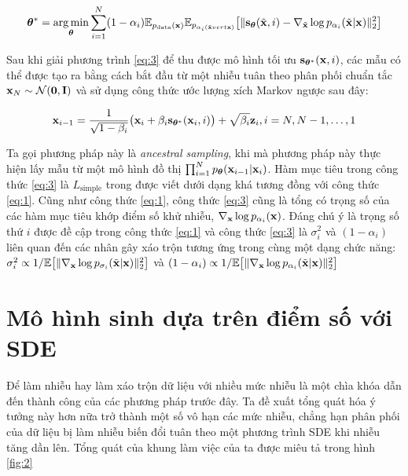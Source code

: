 \documentclass{article} %
\begin{document}
\begin{equation} \label{eq:3}
    \boldsymbol{\theta}^{\ast} = \operatorname*{arg\,min}_{\boldsymbol{\theta}} \sum_{i=1}^N (1 - \alpha_i) \mathbb{E}_{p_{\mathrm{data}}(\bold{x})} \mathbb{E}_{p_{\alpha_i (\tilde{\bold{x}} vert \bold{x})}} \big \lbrack \lVert \bold{s}_{\boldsymbol{\theta}} (\tilde{\bold{x}}, i) - \nabla_{\tilde{\bold{x}}} \log p_{\alpha_i} (\tilde{\bold{x}} \vert \bold{x}) \rVert_2^2 \big \rbrack
\end{equation}

Sau khi giải phương trình \ref{eq:3} để thu được mô hình tối ưu $\bold{s}_{\boldsymbol{\theta}^{\ast}}(\bold{x}, i)$, các mẫu có thể được tạo ra bằng cách bắt đầu từ một nhiễu tuân theo phân phối chuẩn tắc $\bold{x}_N \sim \mathcal{N}(\bold{0}, \bold{I})$ và sử dụng công thức ước lượng xích Markov ngược sau đây:

\begin{equation}
    \bold{x}_{i-1} = \dfrac{1}{\sqrt{1-\beta_i}} \big( \bold{x}_i + \beta_i \bold{s}_{\boldsymbol{\theta}^{\ast}} (\bold{x}_i, i) \big) + \sqrt{\beta_i} \bold{z}_i, i = N, N-1, \dots, 1
\end{equation}

Ta gọi phương pháp này là \textit{ancestral sampling}, khi mà phương pháp này thực hiện lấy mẫu từ một mô hình đồ thị $\prod_{i=1}^N p_{\boldsymbol{\theta}} (\bold{x}_{i-1} \vert \bold{x}_i)$.
Hàm mục tiêu trong công thức \ref{eq:3} là $L_{\mathrm{simple}}$ trong \citep{ho2020denoising} được viết dưới dạng khá tương đồng với công thức \ref{eq:1}.
Cũng như công thức \ref{eq:1}, công thức \ref{eq:3} cũng là tổng có trọng số của các hàm mục tiêu khớp điểm số khử nhiễu, $\nabla_{\bold{x}}\log p_{\alpha_i}(\bold{x})$.
Đáng chú ý là trọng số thứ $i$ được đề cập trong công thức \ref{eq:1} và công thức \ref{eq:3} là $\sigma_i^2$ và $(1-\alpha_i)$ liên quan đến các nhân gây xáo trộn tương ứng trong cùng một dạng chức năng:
$\sigma_i^2 \propto 1/\mathbb{E} \big \lbrack \lVert \nabla_{\bold{x}} \log p_{\sigma_i} (\tilde{\bold{x}} \vert \bold{x}) \rVert_2^2 \big \rbrack$ và $(1-\alpha_i) \propto 1/\mathbb{E} \big \lbrack \lVert \nabla_\bold{x} \log p_{\alpha_i}  (\tilde{\bold{x}} \vert \bold{x})\rVert_2^2 \big \rbrack$

\section{Mô hình sinh dựa trên điểm số với SDE}

Để làm nhiễu hay làm xáo trộn dữ liệu với nhiều mức nhiễu là một chìa khóa dẫn đến thành công của các phương pháp trước đây.
Ta đề xuất tổng quát hóa ý tưởng này hơn nữa trở thành một số vô hạn các mức nhiễu, chẳng hạn phân phối của dữ liệu bị làm nhiễu biến đổi tuân theo một phương trình SDE khi nhiễu tăng dần lên.
Tổng quát của khung làm việc của ta được miêu tả trong hình \ref{fig:2}
\end{document}
